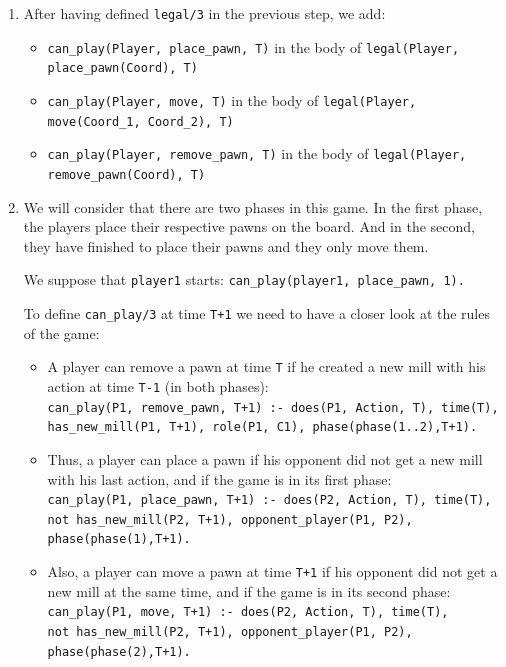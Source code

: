 \documentclass[12pt,twoside]{report}
\begin{document}
\begin{enumerate}
\item After having defined \texttt{legal/3} in the previous step, we add:
\begin{itemize}
\item \texttt{can\_play(Player, place\_pawn, T)} in the body of \texttt{legal(Player, \\place\_pawn(Coord), T) }
\item \texttt{can\_play(Player, move, T)} in the body of \texttt{legal(Player, move(Coord\_1, Coord\_2), T) }
\item \texttt{can\_play(Player, remove\_pawn, T)} in the body of \texttt{legal(Player, \\remove\_pawn(Coord), T) }
\end{itemize}

\item 
We will consider that there are two phases in this game. In the first phase, the players place their respective pawns on the board. And in the second, they have finished to place their pawns and they only move them. 

\bigskip

We suppose that \texttt{player1} starts:
\texttt{can\_play(player1, place\_pawn, 1).} 

\bigskip

To define \texttt{can\_play/3} at time \texttt{T+1} we need to have a closer look at the rules of the game:

\begin{itemize}
\item A player can remove a pawn  at time \texttt{T} if he created a new mill with his action at time \texttt{T-1} (in both phases):\\
\texttt{can\_play(P1, remove\_pawn, T+1) :- does(P1, Action, T), time(T), has\_new\_mill(P1, T+1), role(P1, C1),  phase(phase(1..2),T+1).}
\item Thus, a player can place a pawn if his opponent did not get a new mill with his last action, and if the game is in its first phase:\\
\texttt{can\_play(P1, place\_pawn, T+1) :- does(P2, Action, T), time(T), not has\_new\_mill(P2, T+1), opponent\_player(P1, P2), phase(phase(1),T+1).}
\item Also, a player can move a pawn at time \texttt{T+1} if his opponent did not get a new mill at the same time, and if the game is in its second phase:\\ 
\texttt{can\_play(P1, move, T+1) :- does(P2, Action, T), time(T), \\not has\_new\_mill(P2, T+1), opponent\_player(P1, P2), phase(phase(2),T+1).}
\end{itemize}


\end{enumerate}
\end{document}
